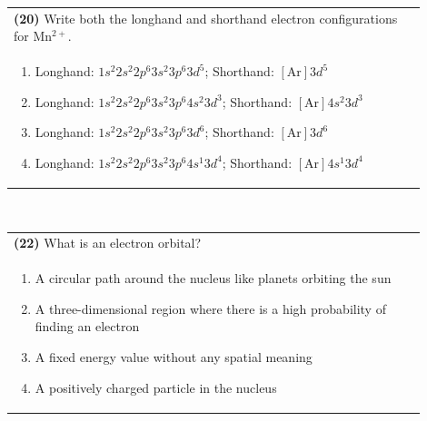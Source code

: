 \documentclass{article}
\begin{document}
\vspace{0.5cm}
\noindent \begin{tabular}{|p{0.9\linewidth}|}
\hline
\vspace{0.2cm}
\textbf{(20)} Write both the longhand and shorthand electron configurations for Mn$^{2+}$. \\
\begin{minipage}[t]{0.85\linewidth}
\begin{enumerate}[label=\alph*.]
\item Longhand: $1s^{2}2s^{2}2p^{6}3s^{2}3p^{6}3d^{5}$; Shorthand: $[\text{Ar}]3d^{5}$
\item Longhand: $1s^{2}2s^{2}2p^{6}3s^{2}3p^{6}4s^{2}3d^{3}$; Shorthand: $[\text{Ar}]4s^{2}3d^{3}$
\item Longhand: $1s^{2}2s^{2}2p^{6}3s^{2}3p^{6}3d^{6}$; Shorthand: $[\text{Ar}]3d^{6}$
\item Longhand: $1s^{2}2s^{2}2p^{6}3s^{2}3p^{6}4s^{1}3d^{4}$; Shorthand: $[\text{Ar}]4s^{1}3d^{4}$
\end{enumerate}
\end{minipage}\\
\hline
\end{tabular}
 \\
 \newpage
\noindent \begin{tabular}{|p{0.9\linewidth}|}
\hline
\vspace{0.2cm}
\textbf{(22)} What is an electron orbital? \\
\begin{minipage}[t]{0.85\linewidth}
\begin{enumerate}[label=\alph*.]
   \item A circular path around the nucleus like planets orbiting the sun  
   \item A three-dimensional region where there is a high probability of finding an electron  
   \item A fixed energy value without any spatial meaning  
   \item A positively charged particle in the nucleus  
\end{enumerate}
\end{minipage}\\
\hline
\end{tabular}
\\
\end{document}
